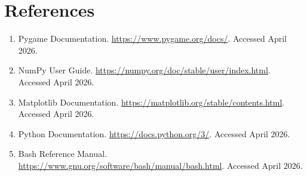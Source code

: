 \documentclass[12pt,a4paper]{article}
\begin{document}
\section{References}

\begin{enumerate}
    \item Pygame Documentation. \url{https://www.pygame.org/docs/}. Accessed April 2026.
    \item NumPy User Guide. \url{https://numpy.org/doc/stable/user/index.html}. Accessed April 2026.
    \item Matplotlib Documentation. \url{https://matplotlib.org/stable/contents.html}. Accessed April 2026.
    \item Python Documentation. \url{https://docs.python.org/3/}. Accessed April 2026.
    \item Bash Reference Manual. \url{https://www.gnu.org/software/bash/manual/bash.html}. Accessed April 2026.
\end{enumerate}
\end{document}
